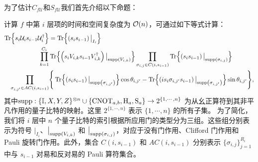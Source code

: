 为了估计$C_{f\mathcal{U}}$和$S_{f\mathcal{U}}$我们首先介绍以下命题：
\begin{proposition}\label{prop:layer_terms}
    计算 $f$ 中第 $i$ 层项的时间和空间复杂度为 $\order{n}$，可通过如下等式计算：
    \begin{equation}\label{eq:i-layer_terms}
    \begin{aligned}
    \Tr{s_i\mathcal{U}_i s_{i-1}\mathcal{U}_i^\dagger}&=\Tr{\left(s_i s_{i-1}\right)\big|_{I_i}}\\
    \prod_{k=1}^{C_i}&\Tr{\left(s_iV_{i,k} s_{i-1}V_{i,k}^{\dagger}\right)\big|_{\text{supp} \left( V_{i,k} \right)}}\prod_{\sigma_{i,j}\in C(i,s_{i-1})}\Tr{\left(s_i s_{i-1}\right)\big|_{\text{supp} \left( \sigma_{i,j} \right)}}\\
    \prod_{\sigma_{i,j'}\in AC(i,s_{i-1})} &\Bigg\{ \Tr{\left(s_i s_{i-1}\right)\big|_{\text{supp} \left( \sigma_{i,j'} \right)}}\cos{\theta_{i,j'}}- \Tr{\left(is_i \sigma_{i,j'}s_{i-1}\right)\big|_{\text{supp} \left( \sigma_{i,j'} \right)}}\sin{\theta_{i,j'}}  \Bigg\},
    \end{aligned}
    \end{equation}
    其中$\text{supp}:\{\mathbb{I}, X, Y, Z\}^{\otimes n}\cup\{\mathrm{CNOT}_{a,b},\mathrm{H}_a,\mathrm{S}_a\}\rightarrow2^{\{1,\cdots, n\}}$ 为从幺正算符到其非平凡作用的量子比特的映射。这里 $2^{\{1,\cdots, n\}}$ 表示 $\{1,\cdots, n\}$ 的所有子集。
    为了简化，我们将 $i$ 层中 $n$ 个量子比特的索引根据所应用门的类型分为三组。这些组分别表示为符号 $\big|_{I_i}$、$\big|_{\text{supp} \left( V_{i,k} \right)}$ 和 $\big|_{\text{supp} \left( \sigma_{i,j} \right)}$，对应于没有门作用、Clifford 门作用和 Pauli 旋转门作用。此外，集合 $C(i,s_{i-1})$ 和 $AC(i,s_{i-1})$ 分别表示 $\{\sigma_{i,j}\}_{j=1}^{R_i}$ 中与 $s_{i-1}$ 对易和反对易的 Pauli 算符集合。
\end{proposition}

